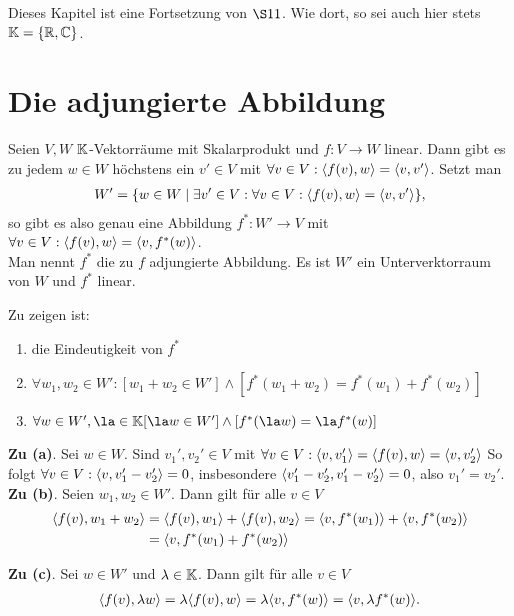 \documentclass[../../main.tex]{subfiles}
\begin{document}
Dieses Kapitel ist eine Fortsetzung von $\S 11$. Wie dort, so sei auch hier stets $\mathbb K=\{\mathbb R, \mathbb C\}$.

\section{Die adjungierte Abbildung}

\begin{defprop}\label{15.1.1}
Seien $V,W$ $\mathbb K$-Vektorräume mit Skalarprodukt und $f: V\to W$ linear. Dann gibt es zu jedem $w\in W$ höchstens ein $v'\in V$ mit $\forall v\in V: \langle f(v),w\rangle=\langle v,v'\rangle$. Setzt man
\begin{align*}
W'=\{w\in W\mid \exists v'\in V: \forall v\in V: \langle f(v),w\rangle=\langle v,v'\rangle\},
\end{align*}
so gibt es also genau eine Abbildung $f^*: W'\to V$ mit $\forall v\in V: \langle f(v),w\rangle=\langle v,f^*(w)\rangle$.\\
Man nennt $f^*$ die zu $f$ adjungierte Abbildung. Es ist $W'$ ein Unterverktorraum von $W$ und $f^*$ linear.
\end{defprop}	
\begin{cproof}
Zu zeigen ist:
\begin{enumerate}[\normalfont(a)]
\item die Eindeutigkeit von $f^*$
\item $\forall w_1,w_2\in W': [w_1+w_2\in W']\land[f^*(w_1+w_2)=f^*(w_1)+f^*(w_2)]$
\item $\forall w\in W', \la\in \K [\la w\in W']\land[f^*(\la w)=\la f^*(w)]$
\end{enumerate}

\textbf{Zu (a)}. Sei $w\in W$. Sind $v_1',v_2'\in V$ mit $\forall v\in V: \langle v,v_1'\rangle=\langle f(v),w\rangle=\langle v,v_2'\rangle$ So folgt $\forall v\in V: \langle v, v_1'-v_2'\rangle=0$, insbesondere $\langle v_1'-v_2',v_1'-v_2'\rangle=0$, also $v_1'=v_2'$.\\

\noindent\textbf{Zu (b)}. Seien $w_1,w_2\in W'$. Dann gilt für alle $v\in V$
\begin{align*}
\langle f(v),w_1+w_2\rangle&=\langle f(v),w_1\rangle+\langle f(v),w_2\rangle=\langle v,f^*(w_1)\rangle+\langle v, f^*(w_2)\rangle\\
&=\langle v,f^*(w_1)+f^*(w_2)\rangle
\end{align*}	

\textbf{Zu (c)}. Sei $w\in W'$ und $\lambda\in \mathbb K$. Dann gilt für alle $v\in V$
\begin{align*}
\langle f(v),\lambda w\rangle=\lambda\langle f(v),w\rangle=\lambda\langle v,f^*(w)\rangle=\langle v,\lambda f^*(w)\rangle.
\end{align*}
\end{cproof}
\end{document}
